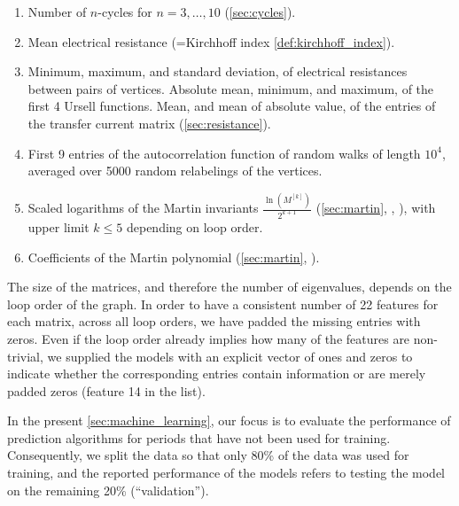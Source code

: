 \documentclass[11pt]{scrartcl}
\numberwithin{equation}{section}
\begin{document}
\begin{enumerate}
    \item Number of $n$-cycles for $n = 3, \dots, 10$ (\cref{sec:cycles}).
    \item Mean electrical resistance (=Kirchhoff index \cref{def:kirchhoff_index}). 
    \item Minimum, maximum, and standard deviation, of electrical resistances between pairs of vertices.  Absolute mean, minimum, and maximum, of the first 4 Ursell functions. Mean, and mean of absolute value, of the entries of the transfer current matrix (\cref{sec:resistance}).
    \item First 9 entries of the autocorrelation function of random walks of length $10^4$, averaged over 5000 random relabelings of the vertices.  
    \item Scaled logarithms of the Martin invariants $\frac{\ln (M^{[k]})}{2^{k+1}}$   (\cref{sec:martin}, \cite[Sec. 6.6]{balduf_statistics_2023}, \cite{panzer_feynman_2023}), with upper limit $k \leq 5$ depending on loop order.  
    \item Coefficients of the Martin polynomial (\cref{sec:martin}, \cite{panzer_feynman_2023}). 
\end{enumerate}

The size of the matrices, and therefore the number of eigenvalues, depends on the loop order of the graph. In order to have a consistent number of 22 features for each matrix, across all loop orders, we have padded the missing entries with zeros. Even if the loop order already implies how many of the features are non-trivial, we supplied the models with an explicit vector of ones and zeros to indicate whether the corresponding entries contain information or are merely padded zeros (feature 14 in the list). 


In the present \cref{sec:machine_learning}, our focus is to evaluate the performance of prediction algorithms for periods that have not been used for training. Consequently,  we split the data so that only 80\% of the data was used for training, and the reported performance of the models refers to testing the model on the remaining 20\% (\enquote{validation}). 
\end{document}
